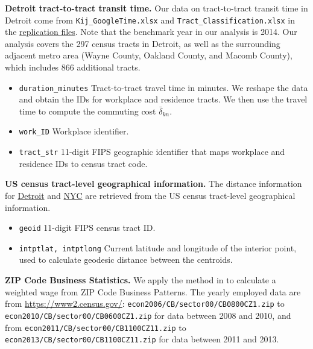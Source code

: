 \documentclass[11pt]{article}
\theoremstyle{definition}
\begin{document}
\noindent \textbf{Detroit tract-to-tract transit time.} 
Our data on tract-to-tract transit time in Detroit come from 
\texttt{Kij\_GoogleTime.xlsx} and \texttt{Tract\_Classification.xlsx} in the 
 \href{https://www.dropbox.com/s/zyanui1llqv2djh/RD\_AEJP\_0651\_Replication\_Files.zip?dl=0}{replication files}. 
Note that the benchmark year in our analysis is 2014. 
Our analysis covers the 297 census tracts in Detroit, as well as the surrounding adjacent metro area 
(Wayne County, Oakland County, and Macomb County), which includes 866 additional tracts.

\begin{itemize}
\item \texttt{duration\_minutes} Tract-to-tract travel time in minutes. 
We reshape the data and obtain the IDs for workplace and residence tracts. 
We then use the travel time to compute the commuting cost $\bar{\delta}_{kn}$.
\item \texttt{work\_ID} Workplace identifier.
\item \texttt{tract\_str} 11-digit FIPS geographic identifier that maps workplace and residence IDs to census tract code.
\end{itemize}

\noindent \textbf{US census tract-level geographical information.} The distance information for 
\href{https://www2.census.gov/geo/docs/maps-data/data/gazetteer/2015\_Gazetteer/2015\_gaz\_tracts\_26.txt}{Detroit} and 
\href{https://www2.census.gov/geo/docs/maps-data/data/gazetteer/2015\_Gazetteer/2015\_gaz\_tracts\_36.txt}{NYC} 
are retrieved from the US census tract-level geographical information.
\begin{itemize}
\item \texttt{geoid} 11-digit FIPS census tract ID.
\item \texttt{intptlat, intptlong} Current latitude and longitude of the interior point, 
used to calculate geodesic distance between the centroids.
\end{itemize}

\noindent \textbf{ZIP Code Business Statistics.} We apply the method in  to calculate a weighted wage from ZIP Code Business Patterns. 
The yearly employed data are from \url{https://www2.census.gov/}: \texttt{econ2006/CB/sector00/CB0800CZ1.zip} 
to \texttt{econ2010/CB/sector00/}\allowbreak\texttt{CB0600CZ1.zip} for data between 2008 and 2010,
and from 
\texttt{econ2011/CB/sector00/CB1100CZ11.zip} to \texttt{econ2013/CB/sector00/}\allowbreak\texttt{CB1100CZ11.zip}
for data between 2011 and 2013.
\end{document}
